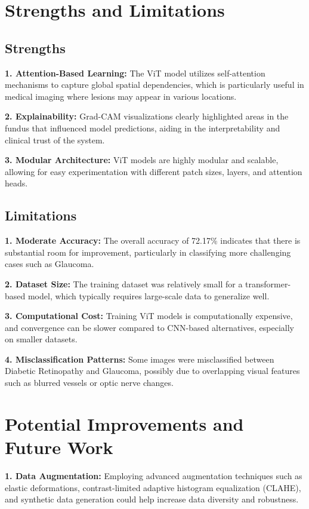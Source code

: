 \documentclass[a4paper,12pt]{report}
\begin{document}
\section{Strengths and Limitations}

\subsection{Strengths}

\textbf{1. Attention-Based Learning:} The ViT model utilizes self-attention mechanisms to capture global spatial dependencies, which is particularly useful in medical imaging where lesions may appear in various locations.

\textbf{2. Explainability:} Grad-CAM visualizations clearly highlighted areas in the fundus that influenced model predictions, aiding in the interpretability and clinical trust of the system.

\textbf{3. Modular Architecture:} ViT models are highly modular and scalable, allowing for easy experimentation with different patch sizes, layers, and attention heads.

\subsection{Limitations}

\textbf{1. Moderate Accuracy:} The overall accuracy of 72.17\% indicates that there is substantial room for improvement, particularly in classifying more challenging cases such as Glaucoma.

\textbf{2. Dataset Size:} The training dataset was relatively small for a transformer-based model, which typically requires large-scale data to generalize well.

\textbf{3. Computational Cost:} Training ViT models is computationally expensive, and convergence can be slower compared to CNN-based alternatives, especially on smaller datasets.

\textbf{4. Misclassification Patterns:} Some images were misclassified between Diabetic Retinopathy and Glaucoma, possibly due to overlapping visual features such as blurred vessels or optic nerve changes.

\section{Potential Improvements and Future Work}

\textbf{1. Data Augmentation:} Employing advanced augmentation techniques such as elastic deformations, contrast-limited adaptive histogram equalization (CLAHE), and synthetic data generation could help increase data diversity and robustness.
\end{document}

